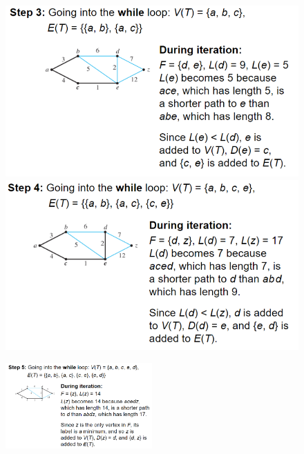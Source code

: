 \documentclass{report}
\begin{document}
\begin{figure}[ht]
\centering
\begin{minipage}{.42\textwidth}
  \centering
  \includegraphics[width=\linewidth]{step3.png}
\end{minipage}\hfill
\begin{minipage}{.4\textwidth}
  \centering
  \includegraphics[width=\linewidth]{step4.png}
\end{minipage}
\end{figure}
\begin{figure}[ht]
\includegraphics[width=0.5\textwidth]{ step5.png }
\end{figure}
\end{document}
